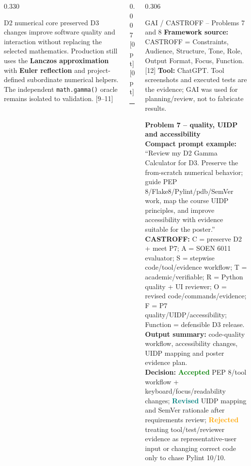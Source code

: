 \documentclass[final]{beamer}
\newcommand{\vdivider}[1]{%
  \begin{column}{0.007\textwidth}
  \centering\color{LineGray!85}%
  \raisebox{-#1}[0pt][0pt]{\rule{0.05cm}{#1}}%
  \end{column}%
}
\begin{document}
\begin{frame}[t]
\begin{columns}[T,totalwidth=0.970\textwidth]
\begin{column}{0.330\textwidth}
\vspace{0.18cm}
\begin{block}{D2 numerical core preserved}
\scriptsize
D3 changes improve software quality and interaction without replacing the selected mathematics. Production still uses the \textbf{Lanczos approximation} with \textbf{Euler reflection} and project-defined subordinate numerical helpers. The independent \texttt{math.gamma()} oracle remains isolated to validation. [9--11]
\end{block}
\end{column}

\vdivider{25.6cm}

\begin{column}{0.306\textwidth}
\begin{alertblock}{GAI / CASTROFF -- Problems 7 and 8}
\footnotesize
\textbf{Framework source:} CASTROFF = Constraints, Audience, Structure, Tone, Role, Output Format, Focus, Function. [12] \textbf{Tool:} ChatGPT. Tool screenshots and executed tests are the evidence; GAI was used for planning/review, not to fabricate results.
\vspace{0.08cm}

\textbf{Problem 7 -- quality, UIDP and accessibility}\\
\textbf{Compact prompt example:} ``Review my D2 Gamma Calculator for D3. Preserve the from-scratch numerical behavior; guide PEP 8/Flake8/Pylint/pdb/SemVer work, map the course UIDP principles, and improve accessibility with evidence suitable for the poster.''\\
\textbf{CASTROFF:} C = preserve D2 + meet P7; A = SOEN 6011 evaluator; S = stepwise code/tool/evidence workflow; T = academic/verifiable; R = Python quality + UI reviewer; O = revised code/commands/evidence; F = P7 quality/UIDP/accessibility; Function = defensible D3 release.\\
\textbf{Output summary:} code-quality workflow, accessibility changes, UIDP mapping and poster evidence plan.\\
\textbf{Decision:} \textcolor{Green}{\bfseries Accepted} PEP 8/tool workflow + keyboard/focus/readability changes; \textcolor{Teal}{\bfseries Revised} UIDP mapping and SemVer rationale after requirements review; \textcolor{Orange}{\bfseries Rejected} treating tool/test/reviewer evidence as representative-user input or changing correct code only to chase Pylint 10/10.


\end{alertblock}
\end{column}
\end{columns}
\end{frame}
\end{document}
